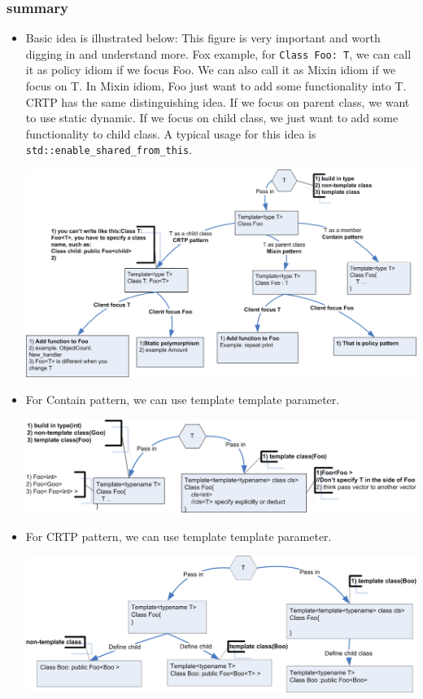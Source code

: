 \documentclass[a4paper,11pt,twoside]{book}
\begin{document}
\subsubsection{summary}
\begin{itemize}
	\item Basic idea is illustrated below: This figure is very important and worth digging in and understand more. Fox example, for \texttt{Class Foo: T}, we can call it as policy idiom if we focus Foo. We can also call it as Mixin idiom if we focus on T. In Mixin idiom, Foo just want to add some functionality into T. CRTP has the same distinguishing idea. If we focus on parent class, we want to use static dynamic. If we focus on child class, we just want to add some functionality to child class. A typical usage for this idea is \texttt{std::enable\_shared\_from\_this}. 

		\includegraphics[width=0.9\linewidth]{pics/mixin.png}
		
	\item For Contain pattern, we can use template template parameter.
	
		\includegraphics[width=0.9\linewidth]{pics/mixin_tt.png}
		
	\item For CRTP pattern, we can use template template parameter.
	
		\includegraphics[width=0.9\linewidth]{pics/crtp_tt.png}

\end{itemize}
\end{document}

